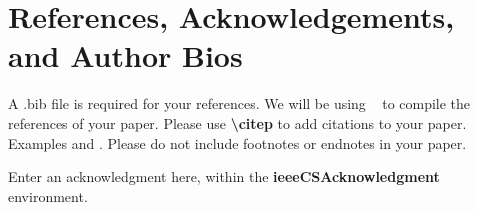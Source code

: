 \documentclass{csmagazine}
\begin{document}

\section{References, Acknowledgements, and Author Bios}

A .bib file is required for your references. We will be using \BibTeX~ to compile the references of your paper. Please use \textbf{\textbackslash{}citep{}} to add citations to your paper. Examples \citep{Lamport1994a} and \citep{Goossens1997}. Please do not include footnotes or endnotes in your paper. \citep{Lamport1994a, Goossens1997}




\begin{ieeecsAcknowledgment}
Enter an acknowledgment here, within the \textbf{ieeeCSAcknowledgment} environment.
\end{ieeecsAcknowledgment}	








\end{document}
